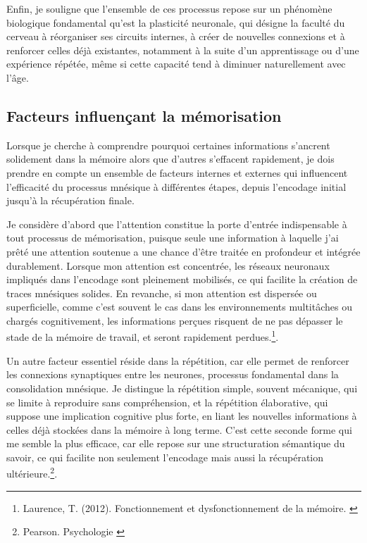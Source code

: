 \documentclass[11pt,a4paper]{report}
\begin{document}
Enfin, je souligne que l’ensemble de ces processus repose sur un phénomène biologique fondamental qu’est la plasticité neuronale, qui désigne la faculté du cerveau à réorganiser ses circuits internes, à créer de nouvelles connexions et à renforcer celles déjà existantes, notamment à la suite d’un apprentissage ou d’une expérience répétée, même si cette capacité tend à diminuer naturellement avec l’âge. 

\vspace{0.5cm}

\subsection{Facteurs influençant la mémorisation}

Lorsque je cherche à comprendre pourquoi certaines informations s’ancrent solidement dans la mémoire alors que d’autres s’effacent rapidement, je dois prendre en compte un ensemble de facteurs internes et externes qui influencent l’efficacité du processus mnésique à différentes étapes, depuis l’encodage initial jusqu’à la récupération finale.

Je considère d’abord que l’attention constitue la porte d’entrée indispensable à tout processus de mémorisation, puisque seule une information à laquelle j’ai prêté une attention soutenue a une chance d’être traitée en profondeur et intégrée durablement. Lorsque mon attention est concentrée, les réseaux neuronaux impliqués dans l’encodage sont pleinement mobilisés, ce qui facilite la création de traces mnésiques solides. En revanche, si mon attention est dispersée ou superficielle, comme c’est souvent le cas dans les environnements multitâches ou chargés cognitivement, les informations perçues risquent de ne pas dépasser le stade de la mémoire de travail, et seront rapidement perdues.\footnote{Laurence, T. (2012). Fonctionnement et dysfonctionnement de la mémoire. \cite{taconnat}}.

Un autre facteur essentiel réside dans la répétition, car elle permet de renforcer les connexions synaptiques entre les neurones, processus fondamental dans la consolidation mnésique. Je distingue la répétition simple, souvent mécanique, qui se limite à reproduire sans compréhension, et la répétition élaborative, qui suppose une implication cognitive plus forte, en liant les nouvelles informations à celles déjà stockées dans la mémoire à long terme. C’est cette seconde forme qui me semble la plus efficace, car elle repose sur une structuration sémantique du savoir, ce qui facilite non seulement l’encodage mais aussi la récupération ultérieure.\footnote{Pearson. Psychologie \cite{pearson}}.
\end{document}
